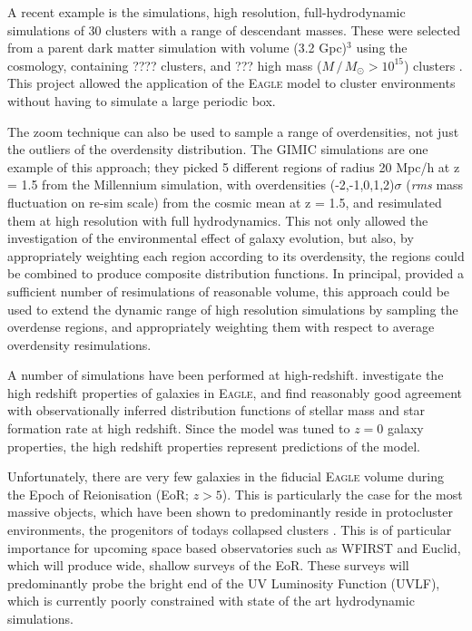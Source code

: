 A recent example is the  simulations, high resolution, full-hydrodynamic simulations of 30 clusters with a range of descendant masses.
These were selected from a parent dark matter simulation with volume (3.2 Gpc)$^3$ using the \cite{planck_collaboration_planck_2014} cosmology, containing ???? clusters, and ??? high mass ($M \,/\, M_{\odot} > 10^{15}$) clusters \citep{barnes_redshift_2017}.
This project allowed the application of the \textsc{Eagle} model to cluster environments without having to simulate a large periodic box.


The zoom technique can also be used to sample a range of overdensities, not just the outliers of the overdensity distribution.
The \textsc{GIMIC} simulations \citep{crain_galaxies-intergalactic_2009} are one example of this approach; they picked 5 different regions of radius 20 Mpc/h at z = 1.5 from the Millennium simulation, with overdensities (-2,-1,0,1,2)$\sigma$ (\textit{rms} mass fluctuation on re-sim scale) from the cosmic mean at z = 1.5, and resimulated them at high resolution with full hydrodynamics.
This not only allowed the investigation of the environmental effect of galaxy evolution, but also, by appropriately weighting each region according to its overdensity, the regions could be combined to produce composite distribution functions.
In principal, provided a sufficient number of resimulations of reasonable volume, this approach could be used to extend the dynamic range of high resolution simulations by sampling the overdense regions, and appropriately weighting them with respect to average overdensity resimulations.

A number of simulations have been performed at high-redshift.
\cite{furlong_evolution_2015} investigate the high redshift properties of galaxies in \textsc{Eagle}, and find reasonably good agreement with observationally inferred distribution functions of stellar mass and star formation rate at high redshift.
Since the model was tuned to $z=0$ galaxy properties, the high redshift properties represent predictions of the model.

Unfortunately, there are very few galaxies in the fiducial \textsc{Eagle} volume during the Epoch of Reionisation (EoR; $z > 5$).
This is particularly the case for the most massive objects, which have been shown to predominantly reside in protocluster environments, the progenitors of todays collapsed clusters \citep{lovell_characterising_2018,chiang_galaxy_2017}.
This is of particular importance for upcoming space based observatories such as WFIRST and Euclid, which will produce wide, shallow surveys of the EoR.
These surveys will predominantly probe the bright end of the UV Luminosity Function (UVLF), which is currently poorly constrained with state of the art hydrodynamic simulations.

